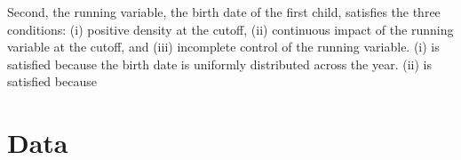 \documentclass[12pt]{article}
\begin{document}
Second, the running variable, the birth date of the first child, satisfies the three conditions: (i) positive density at the cutoff, (ii) continuous impact of the running variable at the cutoff, and (iii) incomplete control of the running variable.
(i) is satisfied because the birth date is uniformly distributed across the year. 
(ii) is satisfied because 
  

\section{Data}



\nocite{*}


\end{document}
